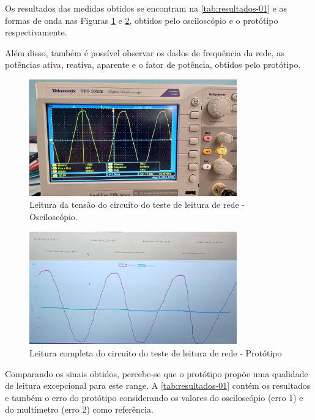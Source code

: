 Os resultados das medidas obtidos se encontram na \autoref{tab:resultados-01} e as formas de onda nas Figuras \ref{fig:leitura-rede-osc} e \ref{fig:leitura-rede-boy-ondas}, obtidos pelo osciloscópio e o protótipo respectivamente. 

Além disso, também é possível observar os dados de frequência da rede, as potências ativa, reativa, aparente e o fator de potência, obtidos pelo protótipo.

\begin{figure}[htb!]
    \caption{Leitura da tensão do circuito do teste de leitura de rede - Osciloscópio.}
    \vspace*{5mm}
    \label{fig:leitura-rede-osc}
    \includegraphics[width=0.8\textwidth]{figuras/leitura-rede-osc.png}
    \fonte{}
\end{figure}

\begin{figure}[htb!]
    \caption{Leitura completa do circuito do teste de leitura de rede - Protótipo}
    \vspace*{5mm}
    \label{fig:leitura-rede-boy-ondas}
    \includegraphics[width=0.8\textwidth]{figuras/leitura-rede-boy-ondas.png}
    \fonte{}
\end{figure}

Comparando os sinais obtidos, percebe-se que o protótipo propõe uma qualidade de leitura excepcional para este range. A \autoref{tab:resultados-01} contém os resultados e também o erro do protótipo considerando os valores do osciloscópio (erro 1) e do multímetro (erro 2) como referência.

